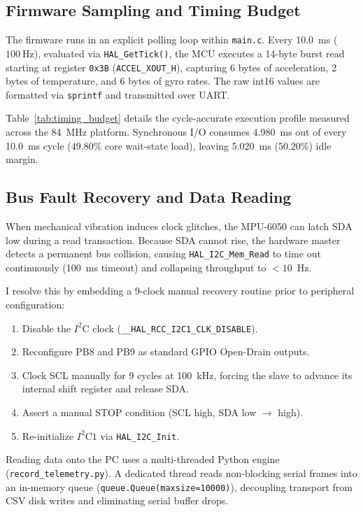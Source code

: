\documentclass[twocolumn]{article}
\begin{document}
\subsection{Firmware Sampling and Timing Budget}
The firmware runs in an explicit polling loop within \texttt{main.c}. Every 10.0~ms ($100~\text{Hz}$), evaluated via \texttt{HAL\_GetTick()}, the MCU executes a 14-byte burst read starting at register \texttt{0x3B} (\texttt{ACCEL\_XOUT\_H}), capturing 6 bytes of acceleration, 2 bytes of temperature, and 6 bytes of gyro rates. The raw int16 values are formatted via \texttt{sprintf} and transmitted over UART.

Table~\ref{tab:timing_budget} details the cycle-accurate execution profile measured across the 84~MHz platform. Synchronous I/O consumes 4.980~ms out of every 10.0~ms cycle ($49.80\%$ core wait-state load), leaving 5.020~ms ($50.20\%$) idle margin.



\subsection{Bus Fault Recovery and Data Reading}
When mechanical vibration induces clock glitches, the MPU-6050 can latch SDA low during a read transaction. Because SDA cannot rise, the hardware master detects a permanent bus collision, causing \texttt{HAL\_I2C\_Mem\_Read} to time out continuously (100~ms timeout) and collapsing throughput to $<10$~Hz.

I resolve this by embedding a 9-clock manual recovery routine prior to peripheral configuration:
\begin{enumerate}[noitemsep]
    \item Disable the $I^2\text{C}$ clock (\texttt{\_\_HAL\_RCC\_I2C1\_CLK\_DISABLE}).
    \item Reconfigure PB8 and PB9 as standard GPIO Open-Drain outputs.
    \item Clock SCL manually for 9 cycles at 100~kHz, forcing the slave to advance its internal shift register and release SDA.
    \item Assert a manual STOP condition (SCL high, SDA low $\to$ high).
    \item Re-initialize $I^2\text{C}1$ via \texttt{HAL\_I2C\_Init}.
\end{enumerate}

Reading data onto the PC uses a multi-threaded Python engine (\texttt{record\_telemetry.py}). A dedicated thread reads non-blocking serial frames into an in-memory queue (\texttt{queue.Queue(maxsize=10000)}), decoupling transport from CSV disk writes and eliminating serial buffer drops.
\end{document}
